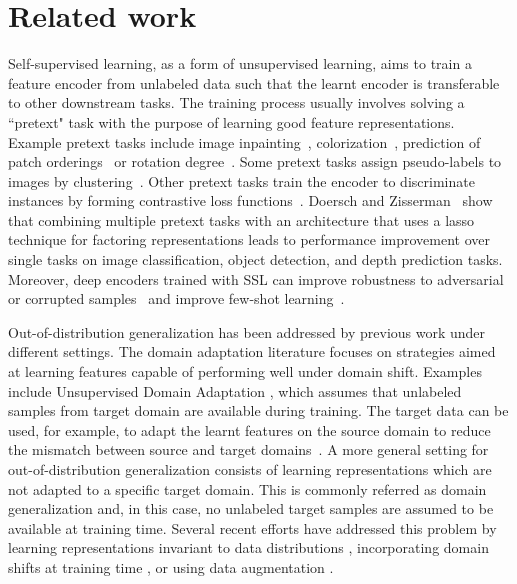 \documentclass[runningheads]{llncs}
\begin{document}
\section{Related work}
\vspace{-0.3cm}
Self-supervised learning, as a form of unsupervised learning, aims to train a feature encoder from unlabeled data such that the learnt encoder is transferable to other downstream tasks. The training process usually involves solving a ``pretext" task with the purpose of learning good feature representations.
Example pretext tasks include image inpainting~\cite{Pathak_2016_inpaiting}, colorization~\cite{Zhang_2016_color,Zhang_2017_splitbrain}, prediction of patch orderings~\cite{Doersch_2015_context,Noroozi_2016_jigsaw} or rotation degree~\cite{gidaris2018unsupervised}. Some pretext tasks assign pseudo-labels to images by clustering~\cite{caron2018deep,Caron_2019_cluster}. Other pretext tasks train the encoder to discriminate instances by forming contrastive loss functions~\cite{Wu_2018_Instance,Ye_2019_end2end,Oord_2018_CPC,He_2019_moco}. Doersch and Zisserman~\cite{Doersch_2017_multitask} show that combining multiple pretext tasks with an architecture that uses a lasso technique for factoring representations leads to performance improvement over single tasks on image classification, object detection, and depth prediction tasks. Moreover, deep encoders trained with SSL can improve robustness to  adversarial or corrupted samples~\cite{hendrycks2019using} and improve few-shot learning~\cite{gidaris2019boosting,su2019does}.


Out-of-distribution generalization has been addressed by previous work under different settings. The domain adaptation literature focuses on strategies aimed at learning features capable of performing well under domain shift. Examples include Unsupervised Domain Adaptation \cite{ben2010theory}, which assumes that unlabeled samples from target domain are available during training. The target data can be used, for example, to adapt the learnt features on the source domain to reduce the mismatch between source and target domains~\cite{ganin2016domain}. A more general setting for out-of-distribution generalization consists of learning representations which are not adapted to a specific target domain. This is commonly referred as domain generalization and, in this case, no unlabeled target samples are assumed to be available at training time. Several recent efforts have addressed this problem by learning representations invariant to data distributions \cite{li2018domain}, incorporating domain shifts at training time \cite{li2018learning,dou2019domain}, or using data augmentation \cite{volpi2018generalizing}.
\end{document}
